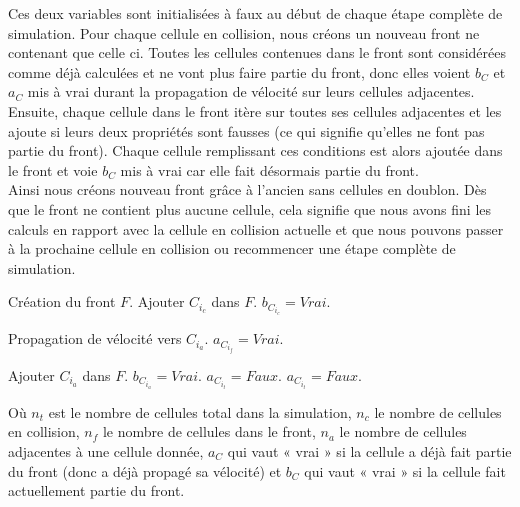\documentclass[a4paper,11pt]{article}
\begin{document}
Ces deux variables sont initialisées à faux au début de chaque étape complète de simulation.
Pour chaque cellule en collision, nous créons un nouveau front ne contenant que celle ci. Toutes les cellules contenues dans le front sont considérées comme déjà calculées et ne vont plus faire partie du front, donc elles voient $b_C$ et $a_C$ mis à vrai durant la propagation de vélocité sur leurs cellules adjacentes.\\
Ensuite, chaque cellule dans le front itère sur toutes ses cellules adjacentes et les ajoute si leurs deux propriétés sont fausses (ce qui signifie qu'elles ne font pas partie du front).
Chaque cellule remplissant ces conditions est alors ajoutée dans le front et voie $b_C$ mis à vrai car elle fait désormais partie du front. \\
Ainsi nous créons nouveau front grâce à l'ancien sans cellules en doublon.
Dès que le front ne contient plus aucune cellule, cela signifie que nous avons fini les calculs en rapport avec la cellule en collision actuelle et que nous pouvons passer à la prochaine cellule en collision ou recommencer une étape complète de simulation.

\medbreak
\begin{algorithmic}[1]
   \STATE Création du front $F$.
      \STATE Ajouter $C_{i_c}$ dans $F$.
      \STATE $b_{C_{i_c}} = Vrai$.
      
	    \STATE Propagation de vélocité vers $C_{i_a}$.
	  \ENDIF
	\ENDFOR
	\STATE $a_{C_{i_f}} = Vrai$.
      \ENDFOR

	    \STATE Ajouter $C_{i_a}$ dans $F$.
	    \STATE $b_{C_{i_a}} = Vrai$.
	  \ENDIF
	\ENDFOR
      \ENDFOR
      \ENDWHILE
	\STATE $a_{C_{i_t}} = Faux$.
	\STATE $a_{C_{i_t}} = Faux$.
      \ENDFOR
   \ENDFOR
\end{algorithmic}
\medbreak

Où $n_t$ est le nombre de cellules total dans la simulation, $n_c$ le nombre de cellules en collision, $n_f$ le nombre de cellules dans le front, $n_a$ le nombre de cellules adjacentes à une cellule donnée, $a_C$ qui vaut « vrai » si la cellule a déjà fait partie du front (donc a déjà propagé sa vélocité) et $b_C$ qui vaut « vrai » si la cellule fait actuellement partie du front. \\
\end{document}
